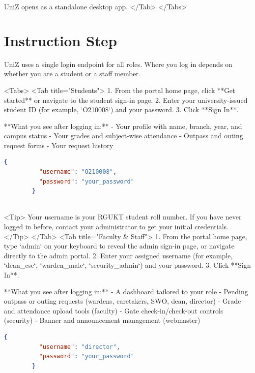         UniZ opens as a standalone desktop app.
      </Tab>
    </Tabs>

  

  
\section{Instruction Step}

    UniZ uses a single login endpoint for all roles. Where you log in depends on whether you are a student or a staff member.

    <Tabs>
      <Tab title="Students">
        1. From the portal home page, click **Get started** or navigate to the student sign-in page.
        2. Enter your university-issued student ID (for example, `O210008`) and your password.
        3. Click **Sign In**.

        **What you see after logging in:**
        - Your profile with name, branch, year, and campus status
        - Your grades and subject-wise attendance
        - Outpass and outing request forms
        - Your request history

        \begin{lstlisting}[language=json]
        {
          "username": "O210008",
          "password": "your_password"
        }
        
\end{lstlisting}

        <Tip>
          Your username is your RGUKT student roll number. If you have never logged in before, contact your administrator to get your initial credentials.
        </Tip>
      </Tab>
      <Tab title="Faculty & Staff">
        1. From the portal home page, type `admin` on your keyboard to reveal the admin sign-in page, or navigate directly to the admin portal.
        2. Enter your assigned username (for example, `dean_cse`, `warden_male`, `security_admin`) and your password.
        3. Click **Sign In**.

        **What you see after logging in:**
        - A dashboard tailored to your role
        - Pending outpass or outing requests (wardens, caretakers, SWO, dean, director)
        - Grade and attendance upload tools (faculty)
        - Gate check-in/check-out controls (security)
        - Banner and announcement management (webmaster)

        \begin{lstlisting}[language=json]
        {
          "username": "director",
          "password": "your_password"
        }
        
\end{lstlisting}

